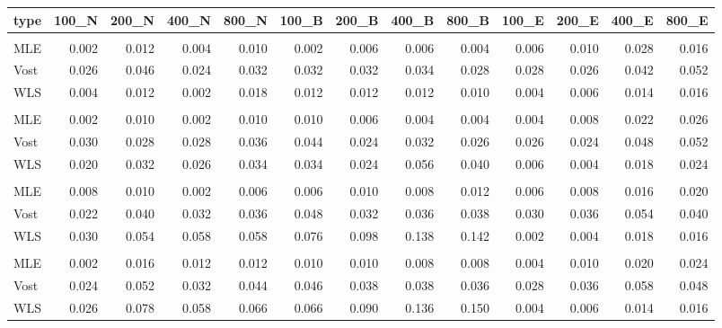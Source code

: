 \documentclass[
]{article}
\begin{document}
\begin{tabular}{lrrrrrrrrrrrr}
\toprule
type & 100\_N & 200\_N & 400\_N & 800\_N & 100\_B & 200\_B & 400\_B & 800\_B & 100\_E & 200\_E & 400\_E & 800\_E\\
\midrule
\addlinespace[0.3em]
\multicolumn{13}{l}{\textbf{0.5}}\\
\hspace{1em}MLE & 0.002 & 0.012 & 0.004 & 0.010 & 0.002 & 0.006 & 0.006 & 0.004 & 0.006 & 0.010 & 0.028 & 0.016\\
\hspace{1em}Vost & 0.026 & 0.046 & 0.024 & 0.032 & 0.032 & 0.032 & 0.034 & 0.028 & 0.028 & 0.026 & 0.042 & 0.052\\
\hspace{1em}WLS & 0.004 & 0.012 & 0.002 & 0.018 & 0.012 & 0.012 & 0.012 & 0.010 & 0.004 & 0.006 & 0.014 & 0.016\\
\addlinespace[0.3em]
\multicolumn{13}{l}{\textbf{0.75}}\\
\hspace{1em}MLE & 0.002 & 0.010 & 0.002 & 0.010 & 0.010 & 0.006 & 0.004 & 0.004 & 0.004 & 0.008 & 0.022 & 0.026\\
\hspace{1em}Vost & 0.030 & 0.028 & 0.028 & 0.036 & 0.044 & 0.024 & 0.032 & 0.026 & 0.026 & 0.024 & 0.048 & 0.052\\
\hspace{1em}WLS & 0.020 & 0.032 & 0.026 & 0.034 & 0.034 & 0.024 & 0.056 & 0.040 & 0.006 & 0.004 & 0.018 & 0.024\\
\addlinespace[0.3em]
\multicolumn{13}{l}{\textbf{1}}\\
\hspace{1em}MLE & 0.008 & 0.010 & 0.002 & 0.006 & 0.006 & 0.010 & 0.008 & 0.012 & 0.006 & 0.008 & 0.016 & 0.020\\
\hspace{1em}Vost & 0.022 & 0.040 & 0.032 & 0.036 & 0.048 & 0.032 & 0.036 & 0.038 & 0.030 & 0.036 & 0.054 & 0.040\\
\hspace{1em}WLS & 0.030 & 0.054 & 0.058 & 0.058 & 0.076 & 0.098 & 0.138 & 0.142 & 0.002 & 0.004 & 0.018 & 0.016\\
\addlinespace[0.3em]
\multicolumn{13}{l}{\textbf{1.05}}\\
\hspace{1em}MLE & 0.002 & 0.016 & 0.012 & 0.012 & 0.010 & 0.010 & 0.008 & 0.008 & 0.004 & 0.010 & 0.020 & 0.024\\
\hspace{1em}Vost & 0.024 & 0.052 & 0.032 & 0.044 & 0.046 & 0.038 & 0.038 & 0.036 & 0.028 & 0.036 & 0.058 & 0.048\\
\hspace{1em}WLS & 0.026 & 0.078 & 0.058 & 0.066 & 0.066 & 0.090 & 0.136 & 0.150 & 0.004 & 0.006 & 0.014 & 0.016\\
\bottomrule
\end{tabular}
\end{document}

